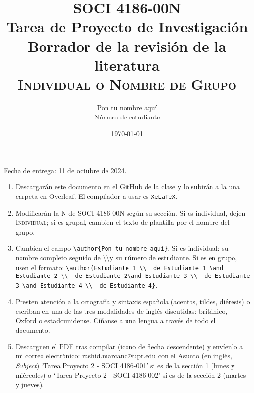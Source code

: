 \documentclass[11pt]{article}
\title{SOCI 4186-00N\\ Tarea de Proyecto de Investigación \textnumero 3 \\ Borrador de la revisión de la literatura \\ \textsc{Individual o Nombre de Grupo}}
\author{Pon tu nombre aquí \\ Número de estudiante}
\date{\today} %
\begin{document}
\singlespacing
\maketitle
Fecha de entrega: 11 de octubre de 2024.

\begin{enumerate}
    \item Descargarán este documento en el GitHub de la clase y lo subirán a la una carpeta en Overleaf. El compilador a usar es \texttt{XeLaTeX}.
    \item Modificarán la N de SOCI 4186-00N según su sección. Si es individual, dejen \textsc{Individual}; si es grupal, cambien el texto de plantilla por el nombre del grupo.
    \item Cambien el campo \texttt{\textbackslash author\{Pon tu nombre aquí\}}. Si es individual: su nombre completo seguido de \textbackslash\textbackslash y su número de estudiante. Si es en grupo, usen el formato: \texttt{\textbackslash author\{Estudiante 1 \textbackslash\textbackslash \ \textnumero\ de Estudiante 1 \textbackslash and Estudiante 2 \textbackslash\textbackslash \ \textnumero\ de Estudiante 2\textbackslash and Estudiante 3 \textbackslash\textbackslash \ \textnumero\ de Estudiante 3 \textbackslash and Estudiante 4 \textbackslash\textbackslash\ \textnumero\ de Estudiante 4\}}.
    \item Presten atención a la ortografía y sintaxis española (acentos, tildes, diéresis) o escriban en una de las tres modalidades de inglés discutidas: británico, Oxford o estadounidense. Cíñanse a una lengua a través de todo el documento.
    \item Descarguen el PDF tras compilar (icono de flecha descendente) y envíenlo a mi correo electrónico: \href{mailto:rashid.marcano@upr.edu}{rashid.marcano@upr.edu}%
    con el Asunto (en inglés, \textit{Subject}) `Tarea Proyecto 2 - SOCI 4186-001' si es de la sección 1 (lunes y miércoles) o `Tarea Proyecto 2 - SOCI 4186-002' si es de la sección 2 (martes y jueves).
\end{enumerate}
\end{document}
